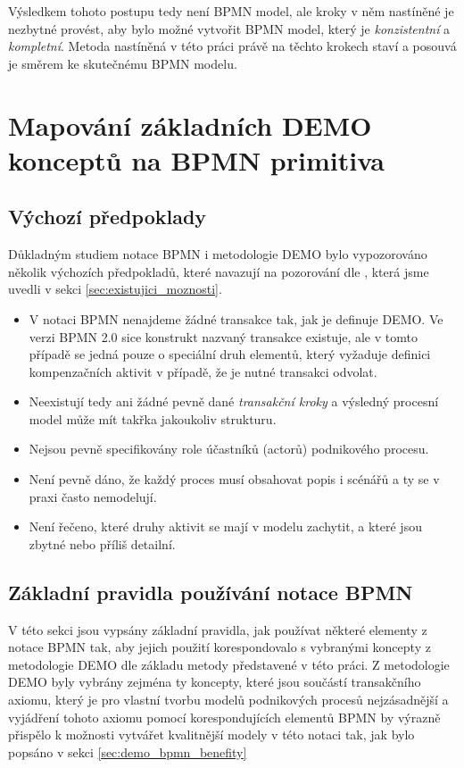 \documentclass[]{article}
\begin{document}
Výsledkem tohoto postupu tedy není BPMN model, ale kroky v něm nastíněné je nezbytné provést, aby bylo možné vytvořit BPMN model, který je \textit{konzistentní} a \textit{kompletní}. Metoda nastíněná v této práci právě na těchto krokech staví a posouvá je směrem ke skutečnému BPMN modelu.

\section{Mapování základních DEMO konceptů na BPMN primitiva}
\subsection{Výchozí předpoklady}
Důkladným studiem notace BPMN i metodologie DEMO bylo vypozorováno několik výchozích předpokladů, které navazují na pozorování dle \cite{VanNuffel2009}, která jsme uvedli v sekci \ref{sec:existujici_moznosti}.

\begin{itemize}
\item V notaci BPMN nenajdeme žádné transakce tak, jak je definuje DEMO. Ve verzi BPMN 2.0 sice konstrukt nazvaný transakce existuje, ale v tomto případě se jedná pouze o speciální druh elementů, který vyžaduje definici kompenzačních aktivit v případě, že je nutné transakci odvolat.
\item Neexistují tedy ani žádné pevně dané \textit{transakční kroky} a výsledný procesní model může mít takřka jakoukoliv strukturu.
\item Nejsou pevně specifikovány role účastníků (actorů) podnikového procesu.
\item Není pevně dáno, že každý proces musí obsahovat popis  i  scénářů a ty  se v praxi často nemodelují.
\item Není řečeno, které druhy aktivit se mají v modelu zachytit, a které jsou zbytné nebo příliš detailní.
\end{itemize}

\subsection{Základní pravidla používání notace BPMN} \label{sec:zakladni_pravidla}
V této sekci jsou vypsány základní pravidla, jak používat některé elementy z notace BPMN tak, aby jejich použití korespondovalo s vybranými koncepty z metodologie DEMO dle základu metody představené v této práci. Z metodologie DEMO byly vybrány zejména ty koncepty, které jsou součástí transakčního axiomu, který je pro vlastní tvorbu modelů podnikových procesů nejzásadnější a vyjádření tohoto axiomu pomocí korespondujících elementů BPMN by výrazně přispělo k možnosti vytvářet kvalitnější modely v této notaci tak, jak bylo popsáno v sekci \ref{sec:demo_bpmn_benefity}
\end{document}
